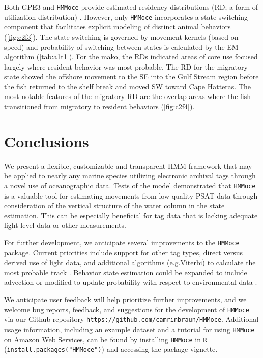 Both GPE3 and \texttt{HMMoce} provide estimated residency distributions
(RD; a form of utilization distribution) \citep{Pedersen2011}. However,
only \texttt{HMMoce} incorporates a state-switching component that
facilitates explicit modeling of distinct animal behaviors (\cref{fig:c2f3}). The state-switching is governed by movement kernels
(based on speed) and probability of switching between states is
calculated by the EM algorithm (\cref{tab:a1t1}). For the mako, the RDs
indicated areas of core use focused largely where resident behavior was
most probable. The RD for the migratory state showed the offshore
movement to the SE into the Gulf Stream region before the fish returned
to the shelf break and moved SW toward Cape Hatteras. The most notable
features of the migratory RD are the overlap areas where the fish
transitioned from migratory to resident behaviors (\cref{fig:c2f4}).

\section{Conclusions}

We present a flexible, customizable and transparent HMM framework that
may be applied to nearly any marine species utilizing electronic
archival tags through a novel use of oceanographic data. Tests of the
model demonstrated that \texttt{HMMoce} is a valuable tool for
estimating movements from low quality PSAT data through consideration of
the vertical structure of the water column in the state estimation. This
can be especially beneficial for tag data that is lacking adequate
light-level data or other measurements.

For further development, we anticipate several improvements to the
\texttt{HMMoce} package. Current priorities include support for other
tag types, direct versus derived use of light data, and additional
algorithms (e.g.Viterbi) to calculate the most probable track
\citep{Pedersen2011}. Behavior state estimation could be expanded to
include advection or modified to update probability with respect to
environmental data \citep{Patterson2009}.

We anticipate user feedback will help prioritize further improvements,
and we welcome bug reports, feedback, and suggestions for the
development of \texttt{HMMoce} via our Github repository
\texttt{https://github.com/camrinbraun/HMMoce}. Additional usage
information, including an example dataset and a tutorial for using
\texttt{HMMoce} on Amazon Web Services, can be found by installing
\texttt{HMMoce} in \texttt{R} (\texttt{install.packages("HMMoce")}) and
accessing the package vignette.
